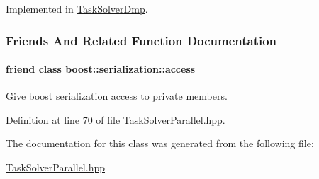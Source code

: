 Implemented in \hyperlink{classDmpBbo_1_1TaskSolverDmp_aef8605bc2d34bea9994507202e0368c2}{Task\+Solver\+Dmp}.



\subsubsection{Friends And Related Function Documentation}
\hypertarget{classDmpBbo_1_1TaskSolverParallel_ac98d07dd8f7b70e16ccb9a01abf56b9c}{
\paragraph[{boost\+::serialization\+::access}]{\setlength{\rightskip}{0pt plus 5cm}friend class boost\+::serialization\+::access\hspace{0.3cm}{\ttfamily [friend]}}}\label{classDmpBbo_1_1TaskSolverParallel_ac98d07dd8f7b70e16ccb9a01abf56b9c}


Give boost serialization access to private members. 



Definition at line 70 of file Task\+Solver\+Parallel.\+hpp.



The documentation for this class was generated from the following file\+:\begin{DoxyCompactItemize}
\item 
\hyperlink{TaskSolverParallel_8hpp}{Task\+Solver\+Parallel.\+hpp}\end{DoxyCompactItemize}
